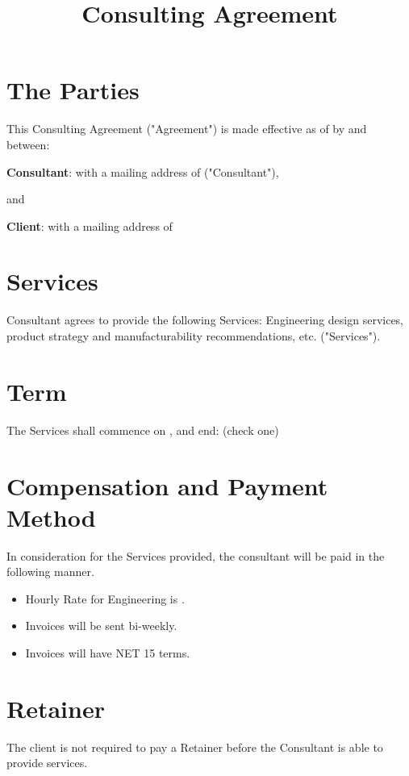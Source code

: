 \documentclass{article}
\title{Consulting Agreement}
\author{}
\begin{document}
\maketitle
\section{The Parties}
This Consulting Agreement ("Agreement") is made effective as of \effectivedate by and between:

\textbf{Consultant}: \consultantname with a mailing address of \consultantaddr ("Consultant"),

and

\textbf{Client}: \clientname with a mailing address of \clientaddr

\section{Services}

Consultant agrees to provide the following Services: Engineering design services, product strategy and manufacturability recommendations, etc. ("Services").

\section{Term}

The Services shall commence on \effectivedate , and end: (check one)



\section{Compensation and Payment Method}
In consideration for the Services provided, the consultant will be paid in the following manner.
\begin{itemize}
    \item Hourly Rate for Engineering is \hourlyrate.
    \item Invoices will be sent bi-weekly.
    \item Invoices will have NET 15 terms.
\end{itemize}

\section{Retainer}
The client is not required to pay a Retainer before the Consultant is able to provide services.
\end{document}

